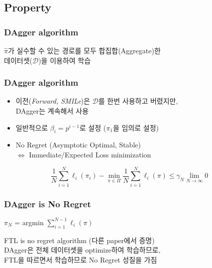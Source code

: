 \documentclass[11pt,xcolor={dvipsnames},hyperref={pdftex,pdfpagemode=UseNone,hidelinks,pdfdisplaydoctitle=true},usepdftitle=false]{beamer}
\begin{document}
\subsection*{Property}
\begin{frame}
\frametitle{DAgger algorithm}

$\hat{\pi}$가 실수할 수 있는 경로를 모두 합집합(Aggregate)한 \\ 데이터셋($\mathcal{D}$)을 이용하여 학습

\vspace{3mm}

\begin{algorithm}[H]
    \SetAlgoLined
    \end{algorithm}

\end{frame}    

\begin{frame}
\frametitle{DAgger algorithm}
\begin{itemize}
    \item 이전(\textit{Forward, SMILe})은 $\mathcal{D}$를 한번 사용하고 버렸지만, \\ DAgger는 계속해서 사용
    \item 일반적으로 $\beta_i = p^{i-1}$로 설정 ($\pi_1$을 임의로 설정)
    \item No Regret {\scriptsize (Asymptotic Optimal, Stable)} \\
    $\Leftrightarrow$ Immediate/Expected Loss minimization
\end{itemize}

\begin{equation}
    \frac{1}{N} \sum_{i=1}^N \ell_i(\pi_i) - \min_{\pi \in \Pi} \frac{1}{N} \sum_{i=1}^N \ell_i(\pi) \leq \gamma_N \lim_{N \to \infty} 0
\end{equation}
\end{frame}

\begin{frame}
    \frametitle{DAgger is No Regret}
    \begin{theorem}
        $\pi_N$ = argmin $\sum_{i=1}^{N-1} \ell_i(\pi)$ \\
    \end{theorem}
    
    FTL is no regret algorithm (다른 paper에서 증명) \\
    DAgger은 전체 데이터셋을 optimize하여 학습하므로, \\
    FTL을 따르면서 학습하므로 No Regret 성질을 가짐
\end{frame}    
\end{document}
